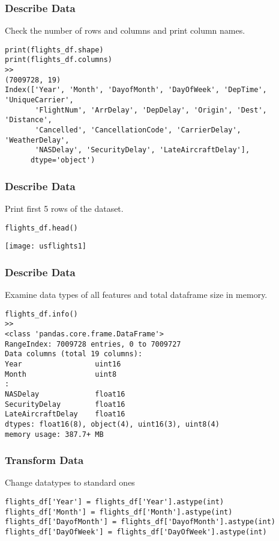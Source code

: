 \begin{frame}[fragile]\frametitle{Describe Data}	
Check the number of rows and columns and print column names.
\begin{lstlisting}
print(flights_df.shape)
print(flights_df.columns)
>>
(7009728, 19)
Index(['Year', 'Month', 'DayofMonth', 'DayOfWeek', 'DepTime', 'UniqueCarrier',
       'FlightNum', 'ArrDelay', 'DepDelay', 'Origin', 'Dest', 'Distance',
       'Cancelled', 'CancellationCode', 'CarrierDelay', 'WeatherDelay',
       'NASDelay', 'SecurityDelay', 'LateAircraftDelay'],
      dtype='object')
\end{lstlisting}
\end{frame}

\begin{frame}[fragile]\frametitle{Describe Data}	
Print first 5 rows of the dataset.
\begin{lstlisting}
flights_df.head()
\end{lstlisting}
\begin{center}
\texttt{[image: usflights1]}
\end{center}
\end{frame}

\begin{frame}[fragile]\frametitle{Describe Data}	
Examine data types of all features and total dataframe size in memory.
\begin{lstlisting}
flights_df.info()
>>
<class 'pandas.core.frame.DataFrame'>
RangeIndex: 7009728 entries, 0 to 7009727
Data columns (total 19 columns):
Year                 uint16
Month                uint8
:
NASDelay             float16
SecurityDelay        float16
LateAircraftDelay    float16
dtypes: float16(8), object(4), uint16(3), uint8(4)
memory usage: 387.7+ MB
\end{lstlisting}
\end{frame}

\begin{frame}[fragile]\frametitle{Transform Data}	
Change datatypes to standard ones

\begin{lstlisting}
flights_df['Year'] = flights_df['Year'].astype(int)
flights_df['Month'] = flights_df['Month'].astype(int)
flights_df['DayofMonth'] = flights_df['DayofMonth'].astype(int)
flights_df['DayOfWeek'] = flights_df['DayOfWeek'].astype(int)
\end{lstlisting}
\end{frame}

